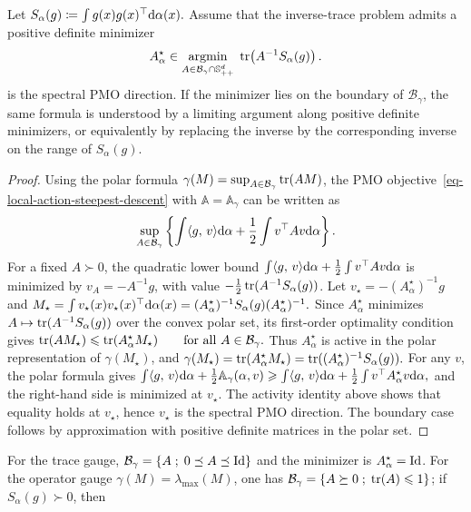 \begin{prop}\label{prop-normalized-spectral-polar}
Let
\(S_\alpha(g)\coloneqq\int g(x)g(x)^\top\mathrm{d}\alpha(x).\)
Assume that the inverse-trace problem admits a positive definite minimizer
\[
A_\alpha^\star
\in
\underset{A\in\mathcal B_\gamma\cap\mathbb S_{++}^d}{\operatorname{argmin}}\;
\operatorname{tr}\!\left(A^{-1}S_\alpha(g)\right).
\]
is the spectral PMO direction. If the minimizer lies on the boundary of $\mathcal B_\gamma$, the same formula is understood by a limiting argument along positive definite minimizers, or equivalently by replacing the inverse by the corresponding inverse on the range of $S_\alpha(g)$.
\end{prop}
\begin{proof}
Using the polar formula $\gamma(M)=\sup_{A\in\mathcal B_\gamma}\operatorname{tr}(AM)$, the PMO objective~\eqref{eq-local-action-steepest-descent} with \(\mathbb A=\mathbb A_\gamma\) can be written as
\[
\sup_{A\in\mathcal B_\gamma}
\left\{
\int \langle g,\,v\rangle\mathrm{d}\alpha
+
\frac12\int v^\top A v\mathrm{d}\alpha
\right\}.
\]
For a fixed $A\succ0$, the quadratic lower bound
\(\int \langle g,\,v\rangle\mathrm{d}\alpha+\frac12\int v^\top A v\mathrm{d}\alpha\)
is minimized by $v_A=-A^{-1}g$, with value $-\frac12\operatorname{tr}(A^{-1}S_\alpha(g))$. Let $v_\star=-(A_\alpha^\star)^{-1}g$ and
\(M_\star=\int v_\star(x)v_\star(x)^\top\mathrm{d}\alpha(x) = (A_\alpha^\star)^{-1}S_\alpha(g)(A_\alpha^\star)^{-1}.\)
Since $A_\alpha^\star$ minimizes $A\mapsto\operatorname{tr}(A^{-1}S_\alpha(g))$ over the convex polar set, its first-order optimality condition gives
\(\operatorname{tr}(AM_\star)\leqslant \operatorname{tr}(A_\alpha^\star M_\star) \qquad \text{for all } A\in\mathcal B_\gamma.\)
Thus $A_\alpha^\star$ is active in the polar representation of $\gamma(M_\star)$, and
\(\gamma(M_\star)=\operatorname{tr}(A_\alpha^\star M_\star) = \operatorname{tr}((A_\alpha^\star)^{-1}S_\alpha(g)).\)
For any $v$, the polar formula gives \(\int \langle g,\,v\rangle\mathrm{d}\alpha+\frac12\mathbb A_\gamma(\alpha,v) \geqslant \int \langle g,\,v\rangle\mathrm{d}\alpha+\frac12\int v^\top A_\alpha^\star v\mathrm{d}\alpha,\)
and the right-hand side is minimized at $v_\star$. The activity identity above shows that equality holds at $v_\star$, hence $v_\star$ is the spectral PMO direction. The boundary case follows by approximation with positive definite matrices in the polar set.
\end{proof}
For the trace gauge, $\mathcal B_\gamma=\left\{ A \;;\; 0\preceq A\preceq\mathrm{Id} \right\}$ and the minimizer is $A_\alpha^\star=\mathrm{Id}$. For the operator gauge $\gamma(M)=\lambda_{\max}(M)$, one has $\mathcal B_\gamma=\left\{ A\succeq0 \;;\; \operatorname{tr}(A)\leqslant1 \right\}$; if $S_\alpha(g)\succ0$, then
